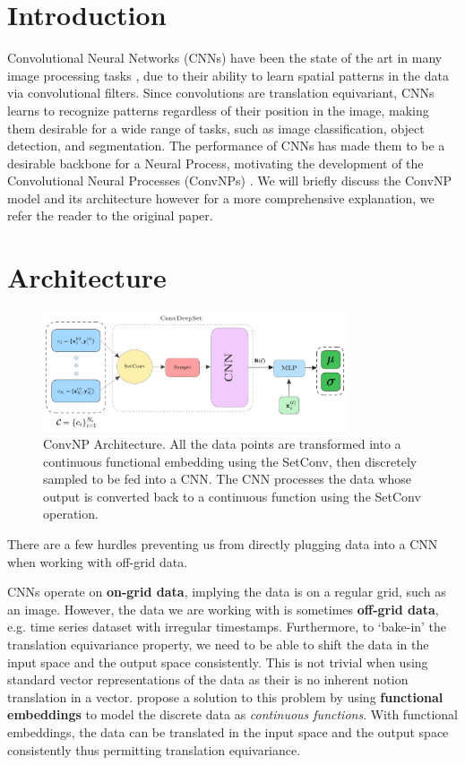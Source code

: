 \documentclass[../../main.tex]{subfiles}
\begin{document}
\section{Introduction}

Convolutional Neural Networks (CNNs) have been the state of the art in many image processing tasks \parencite{he2015deep, simonyan2015deep, NIPS2012_c399862d}, due to their ability to learn spatial patterns in the data via convolutional filters. Since convolutions are translation equivariant, CNNs learns to recognize patterns regardless of their position in the image, making them desirable for a wide range of tasks, such as image classification, object detection, and segmentation. The performance of CNNs has made them to be a desirable backbone for a Neural Process, motivating the development of the Convolutional Neural Processes (ConvNPs) \parencite{gordon2020convolutional}. We will briefly discuss the ConvNP model and its architecture however for a more comprehensive  explanation, we refer the reader to the original paper.

\section{Architecture}

\begin{figure}[H]
	\centering
	\includegraphics[width=0.8\textwidth]{convcnp.png}
	\caption{ConvNP Architecture. All the data points are transformed into a continuous functional embedding using the SetConv, then discretely sampled to be fed into a CNN. The CNN processes the data whose output is converted back to a continuous function using the SetConv operation.}
	\label{fig:convcnp}
\end{figure}

There are a few hurdles preventing us from directly plugging data into a CNN when working with off-grid data.	

CNNs operate on \textbf{on-grid data}, implying the data is on a regular grid, such as an image. However, the data we are working with is sometimes \textbf{off-grid data}, e.g. time series dataset with irregular timestamps. Furthermore, to `bake-in' the translation equivariance property, we need to be able to shift the data in the input space and the output space consistently. This is not trivial when using standard vector representations of the data as their is no inherent notion translation in a vector.
\cite{gordon2020convolutional} propose a solution to this problem by using \textbf{functional embeddings} to model the discrete data as \emph{continuous functions}. With functional embeddings, the data can be translated in the input space and the output space consistently thus permitting translation equivariance.
\end{document}
